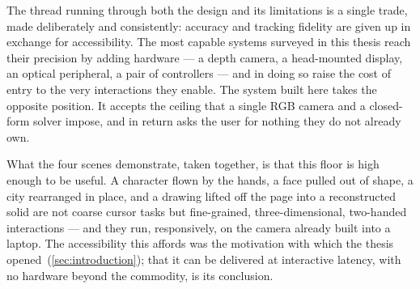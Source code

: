 The thread running through both the design and its limitations is a single trade, made
deliberately and consistently: accuracy and tracking fidelity are given up in exchange
for accessibility. The most capable systems surveyed in this thesis reach their
precision by adding hardware --- a depth camera, a head-mounted display, an optical
peripheral, a pair of controllers --- and in doing so raise the cost of entry to the
very interactions they enable. The system built here takes the opposite position. It
accepts the ceiling that a single RGB camera and a closed-form solver impose, and in
return asks the user for nothing they do not already own.

What the four scenes demonstrate, taken together, is that this floor is high enough to
be useful. A character flown by the hands, a face pulled out of shape, a city
rearranged in place, and a drawing lifted off the page into a reconstructed solid are
not coarse cursor tasks but fine-grained, three-dimensional, two-handed interactions
--- and they run, responsively, on the camera already built into a laptop. The
accessibility this affords was the motivation with which the thesis
opened~(\autoref{sec:introduction}); that it can be delivered at interactive latency,
with no hardware beyond the commodity, is its conclusion.
